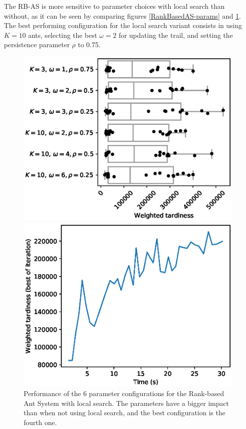 \documentclass[runningheads]{llncs}
\begin{document}
The RB-AS is more sensitive to parameter choices with local search than without,
as it can be seen by comparing figures \ref{RankBasedAS-params} and
\ref{RankBasedAS-LS-params}. The best performing configuration for the local
search variant consists in using $K=10$ ants, selecting the best $\omega=2$ for
updating the trail, and setting the persistence parameter $\rho$ to 0.75.

\begin{figure}
    \centering
    \begin{minipage}{.48\textwidth}
		\centering
		\includegraphics[width=1.1\textwidth]{RankBasedAS-LS-params.eps}
		\caption{Performance of the 6 parameter configurations for the Rank-based
		Ant System with local search. The parameters have a bigger impact than
		when not using local search, and the best configuration is the fourth
		one.}
		\label{RankBasedAS-LS-params}
    \end{minipage}
    \hspace{0.02\textwidth}
    \begin{minipage}{.48\textwidth}
		\centering
		\includegraphics[width=1.1\textwidth]{DD_Ta060-convergence-LS.eps}

\end{minipage}
\end{figure}
\end{document}
